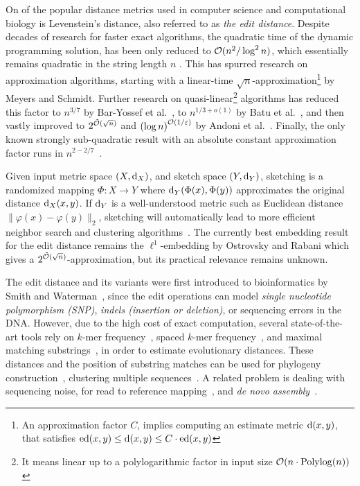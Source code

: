 
On of the popular distance metrics used in computer science and computational biology is Levenstein's distance, also referred to as \emph{the edit distance}. Despite decades of research for faster exact algorithms, the quadratic time of the dynamic programming solution\cite{Vintsyuk1968SpeechProgramming}, has been only reduced to $\mathcal{O}(n^2/\log^2 n)$, which essentially remains quadratic in the string length $n$ \cite{Masek1980ADistances}. This has spurred research on approximation algorithms, starting with a linear-time $\sqrt{n}$-approximation\footnote{An approximation factor $C$, implies computing an estimate metric $\operatorname{\mathrm{d}}(x,y)$, that satisfies ${\operatorname{\mathrm{ed}}(x,y)\le \operatorname{\mathrm{d}}(x,y)\le C \cdot \operatorname{\mathrm{ed}}(x,y)}$} by Meyers and Schmidt\cite{Landau1998IncrementalComparison}. Further research on quasi-linear\footnote{It means linear up to a polylogarithmic factor in input size $\mathcal{O}(n\cdot \mathrm{Polylog}(n))$} algorithms has reduced this factor to $n^{3/7}$ by Bar-Yossef et al.~\cite{Bar-Yossef2004ApproximatingEfficiently}, to $n^{1/3+o(1)}$ by Batu et al.~\cite{batu2006oblivious}, and then vastly improved to $2^{\tilde{\mathcal{O}}(\sqrt{n})}$ and ${(\log n)}^{\mathcal{O}(1/\varepsilon)}$ by Andoni et al.~\cite{Andoni2012ApproximatingTime,Andoni2010PolylogarithmicComplexity}.  Finally, the only known strongly sub-quadratic result with an absolute constant approximation factor runs in $n^{2-2/7}$~\cite{Time2018ApproximatingTime}. 

Given input metric space $(X,\operatorname{\mathrm{d}}_X)$, and sketch space $(Y,\operatorname{\mathrm{d}}_Y)$, sketching is a randomized mapping $\Phi:X\to Y$ where  $\operatorname{\mathrm{d}}_Y(\Phi(x),\Phi(y))$ approximates the original distance $\operatorname{\mathrm{d}}_X(x,y)$. If $\operatorname{\mathrm{d}}_Y$ is a well-understood metric such as Euclidean distance $\|\varphi(x)-\varphi(y)\|_2$, sketching will automatically lead to more efficient neighbor search and clustering algorithms~\cite{Indyk1998ApproximateNeighbors}. The currently best embedding result for the edit distance remains the $\ell^1$-embedding by Ostrovsky and Rabani which gives a $2^{\tilde{\mathcal{O}}(\sqrt{n})}$-approximation, but its practical relevance remains unknown.  


The edit distance and its variants were first introduced to bioinformatics by Smith and Waterman~\cite{Smith1981IdentificationSubsequences}, since the edit operations can model \emph{single nucleotide polymorphism (SNP)}, \emph{indels (insertion or deletion)}, or sequencing errors in the DNA. However, due to the high cost of exact computation, several state-of-the-art tools rely on $k$-mer frequency~\cite{mapleson2016kat}, spaced $k$-mer frequency~\cite{morgenstern2019sequence}, and maximal matching substrings~\cite{thankachan2017greedy}, in order to estimate evolutionary distances. These distances and the position of substring matches can be used for phylogeny construction~\cite{thankachan2017greedy}, clustering multiple sequences~\cite{ondov2016mash}. A related problem is dealing with sequencing noise, for read to reference mapping~\cite{chakraborty2019s}, and \emph{de novo assembly}~\cite{li2016minimap}. 


